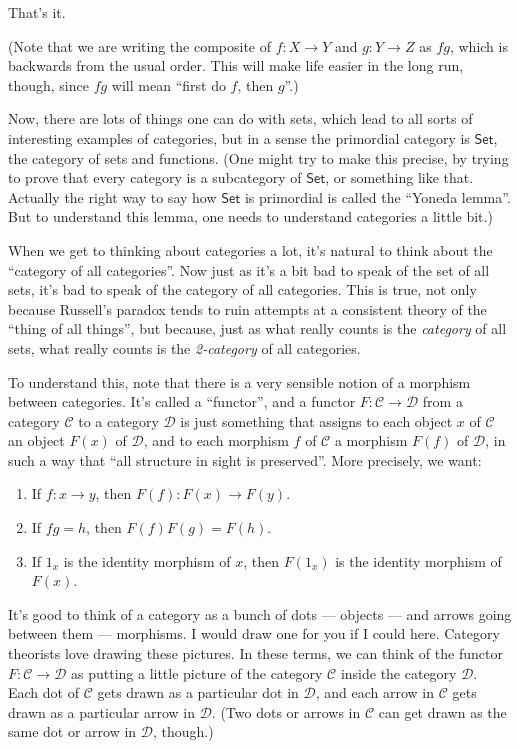 \documentclass{article}
\begin{document}
That's it.

(Note that we are writing the composite of \(f\colon X \to Y\) and
\(g\colon Y \to Z\) as \(fg\), which is backwards from the usual order.
This will make life easier in the long run, though, since \(fg\) will
mean ``first do \(f\), then \(g\)''.)

Now, there are lots of things one can do with sets, which lead to all
sorts of interesting examples of categories, but in a sense the
primordial category is \(\mathsf{Set}\), the category of sets and
functions. (One might try to make this precise, by trying to prove that
every category is a subcategory of \(\mathsf{Set}\), or something like
that. Actually the right way to say how \(\mathsf{Set}\) is primordial
is called the ``Yoneda lemma''. But to understand this lemma, one needs
to understand categories a little bit.)

When we get to thinking about categories a lot, it's natural to think
about the ``category of all categories''. Now just as it's a bit bad to
speak of the set of all sets, it's bad to speak of the category of all
categories. This is true, not only because Russell's paradox tends to
ruin attempts at a consistent theory of the ``thing of all things'', but
because, just as what really counts is the \emph{category} of all sets,
what really counts is the \emph{2-category} of all categories.

To understand this, note that there is a very sensible notion of a
morphism between categories. It's called a ``functor'', and a functor
\(F\colon \mathcal{C} \to \mathcal{D}\) from a category \(\mathcal{C}\)
to a category \(\mathcal{D}\) is just something that assigns to each
object \(x\) of \(\mathcal{C}\) an object \(F(x)\) of \(\mathcal{D}\),
and to each morphism \(f\) of \(\mathcal{C}\) a morphism \(F(f)\) of
\(\mathcal{D}\), in such a way that ``all structure in sight is
preserved''. More precisely, we want:

\begin{enumerate}
\def\labelenumi{\arabic{enumi})}
\item
  If \(f\colon x \to y\), then \(F(f)\colon F(x) \to F(y)\).
\item
  If \(fg = h\), then \(F(f)F(g) = F(h)\).
\item
  If \(1_x\) is the identity morphism of \(x\), then \(F(1_x)\) is the
  identity morphism of \(F(x)\).
\end{enumerate}

It's good to think of a category as a bunch of dots --- objects --- and
arrows going between them --- morphisms. I would draw one for you if I
could here. Category theorists love drawing these pictures. In these
terms, we can think of the functor
\(F\colon \mathcal{C} \to \mathcal{D}\) as putting a little picture of
the category \(\mathcal{C}\) inside the category \(\mathcal{D}\). Each
dot of \(\mathcal{C}\) gets drawn as a particular dot in
\(\mathcal{D}\), and each arrow in \(\mathcal{C}\) gets drawn as a
particular arrow in \(\mathcal{D}\). (Two dots or arrows in
\(\mathcal{C}\) can get drawn as the same dot or arrow in
\(\mathcal{D}\), though.)
\end{document}
